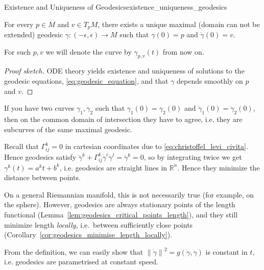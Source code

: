 \begin{colortheo}{Existence and Uniqueness of Geodesics}{existence_uniqueness_geodesics}

For every $p \in M$ and $v \in T_pM$, there exists a unique maximal (domain can not be extended) geodesic $\gamma: (-\epsilon, \epsilon) \to M$ such that $\gamma(0) = p$ and $\dot{\gamma}(0) = v$. 
\end{colortheo}

For such $p,v$ we will denote the curve by $\gamma_{p,v}(t)$ from now on.

\begin{proof}[Proof sketch]
ODE theory yields existence and uniqueness of solutions to the geodesic equations, \eqref{eq:geodesic_equation}, and that $\gamma$ depends smoothly on $p$ and $v$. 
\end{proof}

\begin{colorcor}{}{}
If you have two curves $\gamma_1, \gamma_2$ such that $\gamma_1(0) = \gamma_2(0)$ and $\dot{\gamma}_1(0) = \dot{\gamma}_2(0)$, then on the common domain of intersection they have to agree, i.e. they are subcurves of the same maximal geodesic.
\end{colorcor}



\begin{colremark}
\label{rem:euclidean_geodesics_are_straight}
Recall that $\Gamma_{ij}^k=0$ in cartesian coordinates due to \eqref{eq:christoffel_levi_civita}. Hence geodesics satisfy $\ddot{\gamma}^k + \Gamma_{ij}^k \dot{\gamma}^i \dot{\gamma}^j = \ddot{\gamma}^k = 0$, so by integrating twice we get $\gamma^k(t) = a^k t + b^k$, i.e. geodesics are straight lines in $\mathbb{R}^n$. Hence they minimize the distance between points.

On a general Riemannian manifold, this is not necessarily true (for example, on the sphere). However, geodesics are always stationary points of the length functional (Lemma~\ref{lem:geodesics_critical_points_length}), and they still minimize length \emph{locally}, i.e.\ between sufficiently close points (Corollary~\ref{cor:geodesics_minimise_length_locally}).
\end{colremark}

From the definition, we can easily show that $\left\lVert \dot\gamma \right\rVert^2=g(\dot\gamma,\dot\gamma)$ is constant in $t$, i.e. geodesics are parametrised at constant speed.

